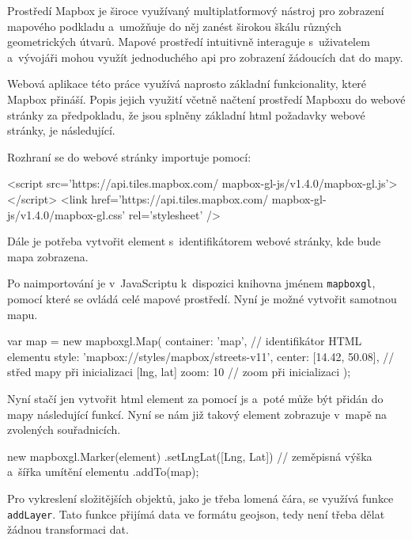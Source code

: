 \bigbreak


Prostředí Mapbox je široce využívaný multiplatformový nástroj pro zobrazení mapového podkladu a~umožňuje do něj zanést širokou škálu různých geometrických útvarů. Mapové prostředí intuitivně interaguje s~uživatelem a~vývojáři mohou využít jednoduchého \gls{api} pro zobrazení žádoucích dat do mapy.


\bigbreak


Webová aplikace této práce využívá naprosto základní funkcionality, které Mapbox přináší. Popis jejich využití včetně načtení prostředí Mapboxu do webové stránky za předpokladu, že jsou splněny základní \gls{html} požadavky webové stránky, je následující.


\bigbreak


Rozhraní se do webové stránky importuje pomocí:


\begin{code}[frame=none]
<script src='https://api.tiles.mapbox.com/
  mapbox-gl-js/v1.4.0/mapbox-gl.js'></script>
<link href='https://api.tiles.mapbox.com/
  mapbox-gl-js/v1.4.0/mapbox-gl.css' rel='stylesheet' />
\end{code}


\bigbreak


Dále je potřeba vytvořit element s~identifikátorem webové stránky, kde bude mapa zobrazena.


\bigbreak


Po naimportování je v~JavaScriptu k~dispozici knihovna jménem \verb-mapboxgl-, pomocí které se ovládá celé mapové prostředí. Nyní je možné vytvořit samotnou mapu.


\begin{code}[frame=none]
var map = new mapboxgl.Map({
  container: 'map', // identifikátor HTML elementu
  style: 'mapbox://styles/mapbox/streets-v11',
  center: [14.42, 50.08], // střed mapy při inicializaci [lng, lat]
    zoom: 10 // zoom při inicializaci
});
\end{code}


Nyní stačí jen vytvořit \gls{html} element za pomocí \gls{js} a~poté může být přidán do mapy následující funkcí. Nyní se nám již takový element zobrazuje v~mapě na zvolených souřadnicích.


\begin{code}[frame=none]
new mapboxgl.Marker(element)
  .setLngLat([Lng, Lat]) // zeměpisná výška a~šířka
    umítění elementu
  .addTo(map);
\end{code}


Pro vykreslení složitějších objektů, jako je třeba lomená čára, se využívá funkce \verb-addLayer-. Tato funkce přijímá data ve formátu \gls{geojson}, tedy není třeba dělat žádnou transformaci dat.


